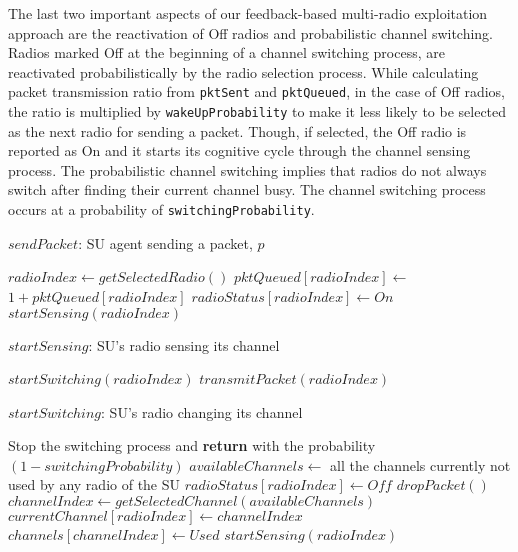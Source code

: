 The last two important aspects of our feedback-based multi-radio exploitation approach are the reactivation of Off radios and probabilistic channel switching. Radios marked Off at the beginning of a channel switching process, are reactivated probabilistically by the radio selection process. While calculating packet transmission ratio from \texttt{pktSent} and \texttt{pktQueued}, in the case of Off radios, the ratio is multiplied by \texttt{wakeUpProbability} to make it less likely to be selected as the next radio for sending a packet. Though, if selected, the Off radio is reported as On and it starts its cognitive cycle through the channel sensing process. The probabilistic channel switching implies that radios do not always switch after finding their current channel busy. The channel switching process occurs at a probability of \texttt{switchingProbability}.

\begin{algorithm}
\caption{$\mathit{sendPacket}$: SU agent sending a packet, $p$}
\label{alg:sendPacket}
\begin{algorithmic}[1]
\State $\mathit{radioIndex}\gets \mathit{getSelectedRadio}()$
\State $pktQueued[radioIndex]\gets $\Statex$ 1+\mathit{pktQueued}[\mathit{radioIndex}]$
\State $\mathit{radioStatus}[\mathit{radioIndex}]\gets \mathit{On}$
\State $\mathit{startSensing}(\mathit{radioIndex})$
\EndFunction
\end{algorithmic}
\end{algorithm}

\begin{algorithm}
\caption{$\mathit{startSensing}$: SU's radio sensing its channel}
\label{alg:startSensing}
\begin{algorithmic}[1]
\State $\mathit{startSwitching}(\mathit{radioIndex})$
\Else
\State $\mathit{transmitPacket}(\mathit{radioIndex})$
\EndIf
\EndFunction
\end{algorithmic}
\end{algorithm}

\begin{algorithm}
\caption{$\mathit{startSwitching}$: SU's radio changing its channel}\label{alg:startSwitching}
\begin{algorithmic}[1]
\State Stop the switching process and \textbf{return} with the probability $(1-\mathit{switchingProbability})$
\State $\mathit{availableChannels} \gets $ all the channels currently not used by any radio of the SU
\State $\mathit{radioStatus}[\mathit{radioIndex}]\gets \mathit{Off}$
\State $\mathit{dropPacket}()$
\Else
\State $\mathit{channelIndex}\gets$\Statex$ \mathit{getSelectedChannel}(\mathit{availableChannels})$
\State $\mathit{currentChannel}[\mathit{radioIndex}] \gets \mathit{channelIndex}$
\State $\mathit{channels}[\mathit{channelIndex}] \gets \mathit{Used}$
\State $\mathit{startSensing}(\mathit{radioIndex})$
\EndIf
\EndFunction
\end{algorithmic}
\end{algorithm}

